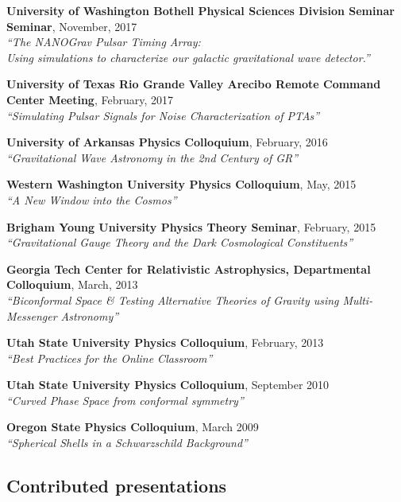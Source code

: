 \documentclass[11pt,letterpaper,sans,unicode]{moderncv}
\newcommand{\invtalkitem}[3]{\item \textbf{#1}, \hfill{#2} \\ \textit{\color{color1}``#3''} \vspace{-0.1cm}} %
\begin{document}
\begin{etaremune}[leftmargin=8mm]
\invtalkitem{University of Washington Bothell Physical Sciences Division Seminar Seminar}{November, 2017}{The NANOGrav Pulsar Timing Array:\\Using simulations to characterize our galactic gravitational wave detector.}
\invtalkitem{University of Texas Rio Grande Valley Arecibo Remote Command Center Meeting}{February, 2017}{Simulating Pulsar Signals for Noise Characterization of PTAs}
\invtalkitem{University of Arkansas Physics Colloquium}{February, 2016}{Gravitational Wave Astronomy in the 2nd Century of GR}
\invtalkitem{Western Washington University Physics Colloquium}{May, 2015}{A New Window into the Cosmos}
\invtalkitem{Brigham Young University Physics Theory Seminar}{February, 2015}{Gravitational Gauge Theory and the Dark Cosmological Constituents}
\invtalkitem{Georgia Tech Center for Relativistic Astrophysics, Departmental Colloquium}{March, 2013}{Biconformal Space \& Testing Alternative Theories of Gravity using Multi-Messenger Astronomy}
\invtalkitem{Utah State University Physics Colloquium}{February, 2013}{Best Practices for the Online Classroom}
\invtalkitem{Utah State University Physics Colloquium}{September 2010}{Curved Phase Space from conformal symmetry}
\invtalkitem{Oregon State Physics Colloquium}{March 2009}{Spherical Shells in a Schwarzschild Background}

\end{etaremune}
\subsection{Contributed presentations} %
\end{document}
